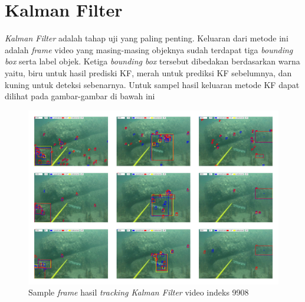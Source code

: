     \section{Kalman Filter}
	    \textit{Kalman Filter} adalah tahap uji yang paling penting. Keluaran dari metode ini adalah \textit{frame} video yang masing-masing objeknya sudah terdapat tiga \textit{bounding box} serta label objek. Ketiga \textit{bounding box} tersebut dibedakan berdasarkan warna yaitu, biru untuk hasil prediski KF, merah untuk prediksi KF sebelumnya, dan kuning untuk deteksi sebenarnya. Untuk sampel hasil keluaran metode KF dapat dilihat pada gambar-gambar di bawah ini
	    
	    \vspace{-0.5cm}
	    \begin{figure}[H]
	    	\centering
	    	\singlespacing
	    	\captionsetup{justification=centering,margin=0.5cm}
	    	\includegraphics[width=13cm]{image/9908/kf_results_9908.jpg}
	    	\caption{Sample \textit{frame} hasil \textit{tracking Kalman Filter} video indeks 9908}
	    	\label{fig:kf_results_9908}
	    \end{figure}
    
